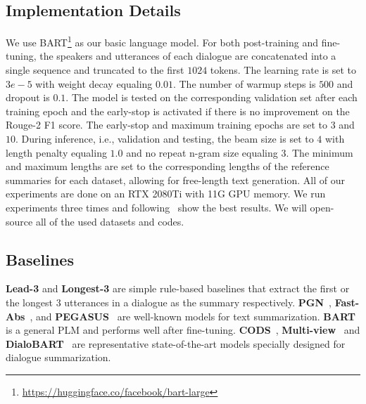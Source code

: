 \subsection{Implementation Details}
We use BART\footnote{\url{https://huggingface.co/facebook/bart-large}} as our basic language model. For both post-training and fine-tuning, the speakers and utterances of each dialogue are concatenated into a single sequence and truncated to the first $1024$ tokens.
The learning rate is set to $3e-5$ with weight decay equaling $0.01$. The number of warmup steps is $500$ and dropout is $0.1$. The model is tested on the corresponding validation set after each training epoch and %
the early-stop is activated if there is no improvement on the Rouge-2 F1 score. 
The early-stop and maximum training epochs are set to $3$ and $10$.
During inference, i.e., validation and testing, 
the beam size is set to $4$ with length penalty equaling $1.0$ 
and no repeat n-gram size equaling $3$. 
The minimum and maximum lengths are set to the corresponding lengths 
of the reference summaries for each dataset, allowing for free-length text generation. 
All of our experiments are done on an RTX 2080Ti with 11G GPU 
memory. We run experiments three times and following~\cite{feng-etal-2021-language} show the best results. We will open-source all of the used datasets and codes.



\subsection{Baselines}
\textbf{Lead-3} and \textbf{Longest-3} are simple rule-based baselines that extract the first or the longest $3$ utterances in a dialogue as the summary respectively. 
\textbf{PGN}~\cite{see2017get}, \textbf{Fast-Abs}~\cite{chen2018fast}, and \textbf{PEGASUS}~\cite{zhang2020pegasus} are well-known models for text summarization. \textbf{BART}~\cite{lewis2020bart} is a general PLM and performs well after fine-tuning.
\textbf{CODS}~\cite{wu-etal-2021-controllable}, \textbf{Multi-view}~\cite{chen2020multi} and \textbf{DialoBART}~\cite{feng-etal-2021-language} are representative state-of-the-art models specially designed for dialogue summarization.

